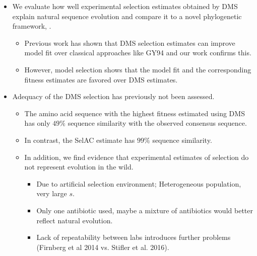 \documentclass[12pt]{article}
\begin{document}
\begin{itemize}
	\item We evaluate how well experimental selection estimates obtained by DMS explain natural sequence evolution and compare it to a novel phylogenetic framework, \selac.
	\begin{itemize}
		\item Previous work has shown that DMS selection estimates can improve model fit over classical approaches like GY94 and our work confirms this.
		\item However, model selection shows that the \selac model fit and the corresponding fitness estimates are favored over DMS estimates.
	\end{itemize}

	\item Adequacy of the DMS selection has previously not been assessed.
	\begin{itemize}
		\item The amino acid sequence with the highest fitness estimated using DMS has only $49 \%$ sequence similarity with the observed consensus sequence.
		\item In contrast, the SelAC estimate has $99 \%$ sequence similarity. 
		\item In addition, we find evidence that experimental estimates of selection do not represent evolution in the wild.
 		\begin{itemize}
			\item Due to artificial selection environment; Heterogeneous population, very large $s$. 
			\item Only one antibiotic used, maybe a mixture of antibiotics would better reflect natural evolution.
			\item Lack of repeatability between labs introduces further problems (Firnberg et al 2014 vs. Stifler et al. 2016).
		\end{itemize}
	\end{itemize}


\end{itemize}
\end{document}
